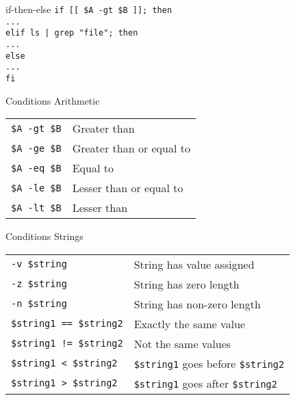 \documentclass{beamer}
\let\tt\texttt
\begin{document}
\begin{frame}{if-then-else}
        \tt{if [[ \$A -gt \$B ]]; then}   \\
        \quad \tt{...}                  \\
        \tt{elif ls | grep "file"; then}\\
        \quad \tt{...}                  \\
        \tt{else}                       \\
        \quad \tt{...}                  \\
        \tt{fi}                         \\
\end{frame}

\begin{frame}{Conditions}
        Arithmetic \\
        \begin{tabular}{l l}
                \tt{\$A -gt \$B}    &   Greater than                \\
                \tt{\$A -ge \$B}    &   Greater than or equal to    \\
                \tt{\$A -eq \$B}    &   Equal to                    \\
                \tt{\$A -le \$B}    &   Lesser than or equal to     \\
                \tt{\$A -lt \$B}    &   Lesser than                 \\
        \end{tabular}
\end{frame}

\begin{frame}{Conditions}
        Strings    \\
        \begin{tabular}{l l}
                \tt{-v \$string}    &   String has value assigned   \\
                \tt{-z \$string}    &   String has zero length      \\
                \tt{-n \$string}    &   String has non-zero length  \\
                \tt{\$string1 == \$string2}    &   Exactly the same value   \\
                \tt{\$string1 != \$string2}    &   Not the same values      \\
                \tt{\$string1 < \$string2}     &   \tt{\$string1} goes before \tt{\$string2} \\
                \tt{\$string1 > \$string2}     &   \tt{\$string1} goes after \tt{\$string2} \\
        \end{tabular}
\end{frame}
\end{document}
